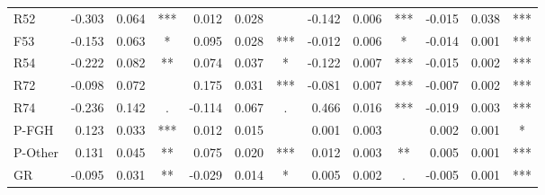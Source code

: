 \documentclass[11pt,letterpaper]{article}
\numberwithin{equation}{section}
\numberwithin{equation}{section}
\numberwithin{equation}{section}
\begin{document}
\begin{center}
\begin{table}
\begin{tabular}{|l|rrc|rrc|rrc|rrc|}
R52       & -0.303 & 0.064 & *** & 0.012   & 0.028 &     & -0.142 & 0.006  & *** & -0.015 & 0.038 & *** \\
F53       & -0.153 & 0.063 & *   & 0.095  & 0.028 & *** & -0.012 & 0.006  & *   & -0.014 & 0.001 & *** \\
R54       & -0.222 & 0.082 & **  & 0.074  & 0.037 & *   & -0.122 & 0.007 & *** & -0.015  & 0.002 & *** \\
R72       & -0.098 & 0.072 &     & 0.175  & 0.031 & *** & -0.081 & 0.007 & *** & -0.007 & 0.002 & *** \\
R74       & -0.236 & 0.142 & .   & -0.114 & 0.067 & .   & 0.466  & 0.016 & *** & -0.019 & 0.003 & *** \\
P-FGH     & 0.123 & 0.033 & *** & 0.012 & 0.015 &     & 0.001    & 0.003 &     & 0.002  & 0.001 & *   \\
P-Other   & 0.131  & 0.045 & **  & 0.075   & 0.020 & *** & 0.012  & 0.003 & **  & 0.005  & 0.001  & *** \\
GR        & -0.095 & 0.031 & **  & -0.029 & 0.014 & *   & 0.005   & 0.002 & .   & -0.005 & 0.001 & *** \\
\hline\hline
\end{tabular}
\end{table}


\end{center}
\end{document}
